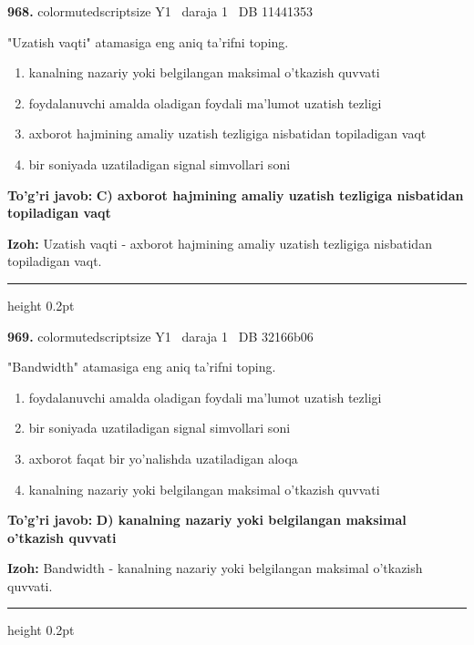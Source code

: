 \documentclass[10pt,a4paper,oneside]{article}
\begin{document}
\noindent\textbf{\color{ink}968.}  {color{muted}scriptsize Y1 \textbullet\ daraja 1 \textbullet\ DB 11441353}
\par
"Uzatish vaqti" atamasiga eng aniq ta'rifni toping.
\begin{enumerate}[label=\Alph*),leftmargin=9mm]
\item kanalning nazariy yoki belgilangan maksimal o'tkazish quvvati
\item foydalanuvchi amalda oladigan foydali ma'lumot uzatish tezligi
\item axborot hajmining amaliy uzatish tezligiga nisbatidan topiladigan vaqt
\item bir soniyada uzatiladigan signal simvollari soni
\end{enumerate}
\begin{tcolorbox}[enhanced,breakable,colback=teal!4,colframe=teal!50!black,boxrule=0.5pt,arc=1.1mm,left=3mm,right=3mm,top=1.7mm,bottom=1.7mm,before skip=2mm,after skip=2mm]
\textbf{\color{teal}To'g'ri javob:} \textbf{C) axborot hajmining amaliy uzatish tezligiga nisbatidan topiladigan vaqt}
\par\smallskip
\textbf{Izoh:} Uzatish vaqti - axborot hajmining amaliy uzatish tezligiga nisbatidan topiladigan vaqt.
\end{tcolorbox}
\vspace{2mm}\hrule height 0.2pt \vspace{3mm}

\noindent\textbf{\color{ink}969.}  {color{muted}scriptsize Y1 \textbullet\ daraja 1 \textbullet\ DB 32166b06}
\par
"Bandwidth" atamasiga eng aniq ta'rifni toping.
\begin{enumerate}[label=\Alph*),leftmargin=9mm]
\item foydalanuvchi amalda oladigan foydali ma'lumot uzatish tezligi
\item bir soniyada uzatiladigan signal simvollari soni
\item axborot faqat bir yo'nalishda uzatiladigan aloqa
\item kanalning nazariy yoki belgilangan maksimal o'tkazish quvvati
\end{enumerate}
\begin{tcolorbox}[enhanced,breakable,colback=teal!4,colframe=teal!50!black,boxrule=0.5pt,arc=1.1mm,left=3mm,right=3mm,top=1.7mm,bottom=1.7mm,before skip=2mm,after skip=2mm]
\textbf{\color{teal}To'g'ri javob:} \textbf{D) kanalning nazariy yoki belgilangan maksimal o'tkazish quvvati}
\par\smallskip
\textbf{Izoh:} Bandwidth - kanalning nazariy yoki belgilangan maksimal o'tkazish quvvati.
\end{tcolorbox}
\vspace{2mm}\hrule height 0.2pt \vspace{3mm}
\end{document}
